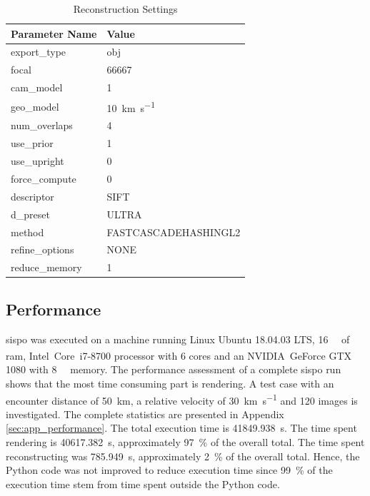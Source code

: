 \begin{table}[htb]
    \centering
    \caption{Reconstruction Settings}
    \label{tab:comp_settings}
    \begin{tabular}{l|l}
        \textbf{Parameter Name} & \textbf{Value} \\ \hline
        export\_type       & obj   \\
        focal & 66667 \\
        cam\_model & \SI{1}{}     \\
        geo\_model & \SI{10}{\kilo\meter\per\second} \\
        num\_overlaps  & \SI{4}{} \\
        use\_prior & \SI{1}{} \\
        use\_upright & \SI{0}{} \\
        force\_compute & \SI{0}{} \\
        descriptor & SIFT \\
        d\_preset & ULTRA \\
        method & FASTCASCADEHASHINGL2 \\
        refine\_options & NONE \\
        reduce\_memory & 1
    \end{tabular}
\end{table}

\subsection{Performance}
\gls{sispo} was executed on a machine running Linux Ubuntu 18.04.03 LTS, \SI{16}{\giga\byte} of \gls{ram}, Intel\textsuperscript{\textregistered}~Core\texttrademark~i7-8700 processor with \SI{6}{} cores and an NVIDIA\textsuperscript{\textregistered}~GeForce GTX 1080 with \SI{8}{\giga\byte} memory. The performance assessment of a complete \gls{sispo} run shows that the most time consuming part is rendering. 
A test case with an encounter distance of \SI{50}{\kilo\meter}, a relative velocity of \SI{30}{\kilo\meter\per\second} and \SI{120}{} images is investigated. The complete statistics are presented in Appendix \ref{sec:app_performance}. The total execution time is \SI{41849.938}{\second}. The time spent rendering is \SI{40617.382}{\second}, approximately \SI{97}{\percent} of the overall total. The time spent reconstructing was \SI{785.949}{\second}, approximately \SI{2}{\percent} of the overall total. Hence, the Python code was not improved to reduce execution time since \SI{99}{\percent} of the execution time stem from time spent outside the Python code.